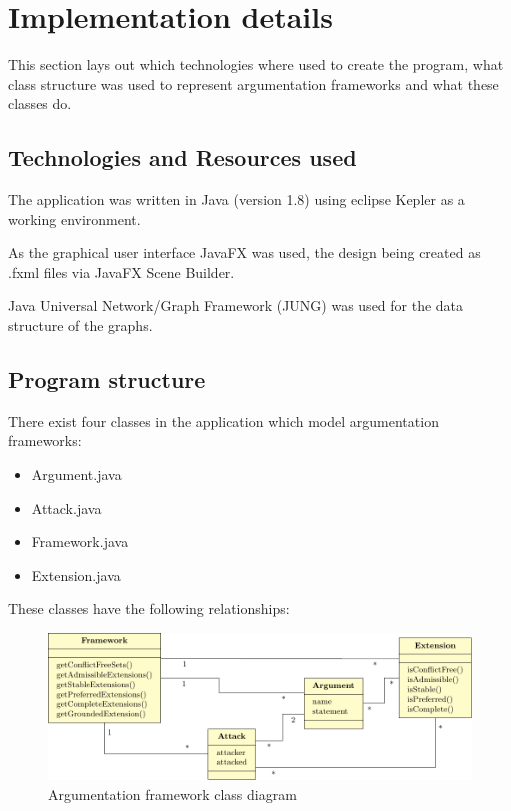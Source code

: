 \documentclass[draft,final]{vutinfth} %
\newcommand{\hl}{\par\vspace{6pt}} %
\newcommand{\cl}{\par\vspace{12pt}} %
\begin{document}
\section{Implementation details}
This section lays out which technologies where used to create the program, what class structure was used to represent argumentation frameworks and what these classes do.\cl %

\subsection{Technologies and Resources used}
The application was written in Java (version 1.8) using eclipse Kepler as a working environment.\hl
As the graphical user interface JavaFX was used, the design being created as .fxml files via JavaFX Scene Builder.\hl
Java Universal Network/Graph Framework (JUNG) was used for the data structure of the graphs.

\subsection{Program structure}
There exist four classes in the application which model argumentation frameworks: %

\begin{itemize}[noitemsep]
	\item Argument.java
	\item Attack.java
	\item Framework.java
	\item Extension.java
\end{itemize}

These classes have the following relationships:

\FloatBarrier
\begin{figure}[!h]
	\centering
	\includegraphics[width=\linewidth]{graphs/classes.pdf} %
	\caption{Argumentation framework class diagram}
\end{figure}
\FloatBarrier
\end{document}
